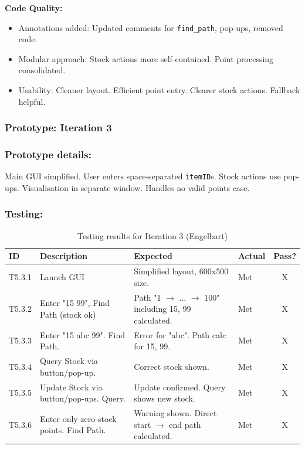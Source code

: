 \textbf{Code Quality:}
\begin{itemize}
	\item Annotations added: Updated comments for \verb|find_path|, pop-ups, removed code.
	\item Modular approach: Stock actions more self-contained. Point processing consolidated.
	\item Usability: Cleaner layout. Efficient point entry. Clearer stock actions. Fallback helpful.
\end{itemize}

\newpage
\subsubsection*{Prototype: Iteration 3}




\newpage

\subsubsection{Prototype details:}
Main GUI simplified. User enters space-separated \verb|itemID|s. Stock actions use pop-ups. Visualisation in separate window. Handles no valid points case.

\subsubsection{Testing:}
\begin{table}[htbp]
	\centering
	\begin{tabularx}{\textwidth}{|l|X|p{4.5cm}|p{1.5cm}|c|}
		\hline
		\textbf{ID} & \textbf{Description} & \textbf{Expected} & \textbf{Actual} & \textbf{Pass?} \\
		\hline
		T5.3.1 & Launch GUI & Simplified layout, 600x500 size. & Met & X \\
		\hline
		T5.3.2 & Enter "15 99", Find Path (stock ok) & Path "1 $\rightarrow$ ... $\rightarrow$ 100" including 15, 99 calculated. & Met & X \\
		\hline
		T5.3.3 & Enter "15 abc 99". Find Path. & Error for "abc". Path calc for 15, 99. & Met & X \\
		\hline
		T5.3.4 & Query Stock via button/pop-up. & Correct stock shown. & Met & X \\
		\hline
		T5.3.5 & Update Stock via button/pop-ups. Query. & Update confirmed. Query shows new stock. & Met & X \\
		\hline
		T5.3.6 & Enter only zero-stock points. Find Path. & Warning shown. Direct start $\rightarrow$ end path calculated. & Met & X \\
		\hline
	\end{tabularx}
	\caption{Testing results for Iteration 3 (Engelbart)}
\end{table}

